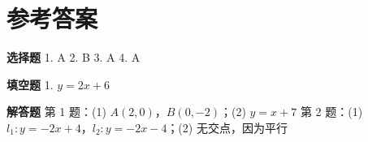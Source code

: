 \documentclass{exam-zh}
\begin{document}
\clearpage
\section*{参考答案}


\begin{keyideabox}
  \textbf{选择题}
  1. A  2. B  3. A  4. A
\end{keyideabox}



\begin{keyideabox}
  \textbf{填空题}
  1. $y = 2x + 6$
\end{keyideabox}



\begin{keyideabox}
  \textbf{解答题}
  第 1 题：(1) $A(2, 0)$，$B(0, -2)$；(2) $y = x + 7$
第 2 题：(1) $l_1: y = -2x + 4$，$l_2: y = -2x - 4$；(2) 无交点，因为平行
\end{keyideabox}
\end{document}
